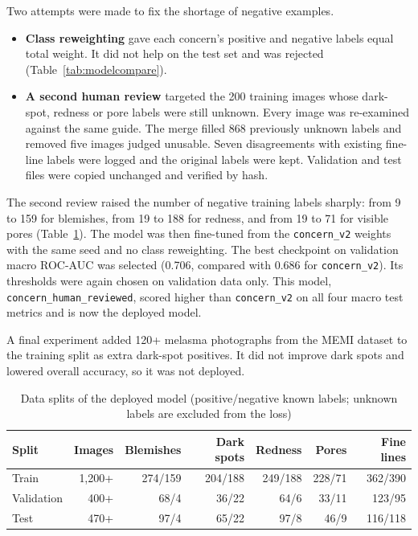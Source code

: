 Two attempts were made to fix the shortage of negative examples.
\begin{itemize}
  \item \textbf{Class reweighting} gave each concern's positive and negative labels equal total weight. It did not help on the test set and was rejected (Table~\ref{tab:modelcompare}).
  \item \textbf{A second human review} targeted the 200 training images whose dark-spot, redness or pore labels were still unknown. Every image was re-examined against the same guide. The merge filled 868 previously unknown labels and removed five images judged unusable. Seven disagreements with existing fine-line labels were logged and the original labels were kept. Validation and test files were copied unchanged and verified by hash.
\end{itemize}

The second review raised the number of negative training labels sharply: from 9 to 159 for blemishes, from 19 to 188 for redness, and from 19 to 71 for visible pores (Table~\ref{tab:splits}). The model was then fine-tuned from the \texttt{concern\_v2} weights with the same seed and no class reweighting. The best checkpoint on validation macro ROC-AUC was selected (0.706, compared with 0.686 for \texttt{concern\_v2}). Its thresholds were again chosen on validation data only. This model, \texttt{concern\_human\_reviewed}, scored higher than \texttt{concern\_v2} on all four macro test metrics and is now the deployed model.

A final experiment added 120+ melasma photographs from the MEMI dataset to the training split as extra dark-spot positives. It did not improve dark spots and lowered overall accuracy, so it was not deployed.

\begin{table}[ht]
\centering\small
\caption{Data splits of the deployed model (positive/negative known labels; unknown labels are excluded from the loss)}
\label{tab:splits}
\begin{tabular}{lrrrrrr}
\toprule
\textbf{Split} & \textbf{Images} & \textbf{Blemishes} & \textbf{Dark spots} & \textbf{Redness} & \textbf{Pores} & \textbf{Fine lines}\\
\midrule
Train & 1,200+ & 274/159 & 204/188 & 249/188 & 228/71 & 362/390\\
Validation & 400+ & 68/4 & 36/22 & 64/6 & 33/11 & 123/95\\
Test & 470+ & 97/4 & 65/22 & 97/8 & 46/9 & 116/118\\
\bottomrule
\end{tabular}
\end{table}

